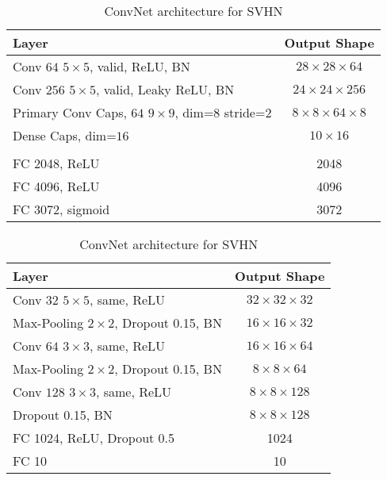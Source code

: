 \begin{table}
	\centering
	
	\begin{tabular}{lc}
		\toprule 
		Layer	& Output Shape \\ 
		\midrule 
		Conv $64$ $5\times5$, valid, ReLU, BN	&  $28\times28\times64$ \\ 
		\midrule 
		Conv $256$ $5\times5$, valid, Leaky ReLU, BN	&  $24\times24\times256$\\ 
		\midrule 
		Primary Conv Caps, $64$ $9\times9$, dim=$8$	stride=$2$ &  $8\times8\times64\times8$\\ 
		\midrule 
		Dense Caps, dim=$16$	&  $10\times16$\\ 
		\midrule
		& \\
		\midrule
		FC 2048, ReLU	& 2048 \\
		\midrule
		FC 4096, ReLU	& 4096 \\
		\midrule
		FC 3072, sigmoid	& 3072\\
		\bottomrule
	\end{tabular}
	\caption{CapsNet architecture for SVHN}
	\label{tab:capsnet:svhn}
	
	\vspace{0.75cm}
	
	\begin{tabular}{lc}
		\toprule 
		Layer	&  Output Shape \\ 
		\midrule 
		Conv $32$ $5\times5$, same,	ReLU & $32\times32\times32$ \\ 
		\midrule 
		Max-Pooling $2\times2$, Dropout 0.15, BN	&  $16\times16\times32$ \\ 
		\midrule 
		Conv $64$ $3\times3$, same, ReLU	& $16\times16\times64$ \\ 
		\midrule 
		Max-Pooling $2\times2$, Dropout 0.15, BN	& $8\times8\times64$ \\
		\midrule
		Conv $128$ $3\times3$, same, ReLU	& $8\times8\times128$ \\
		\midrule
		Dropout 0.15, BN	& $8\times8\times128$ \\
		\midrule
		FC 1024, ReLU, Dropout 0.5 & 1024 \\
		\midrule
		FC 10 & 10\\
		\bottomrule
	\end{tabular}
	\caption{ConvNet architecture for SVHN}
	\label{tab:convnet:svhn}
\end{table}


